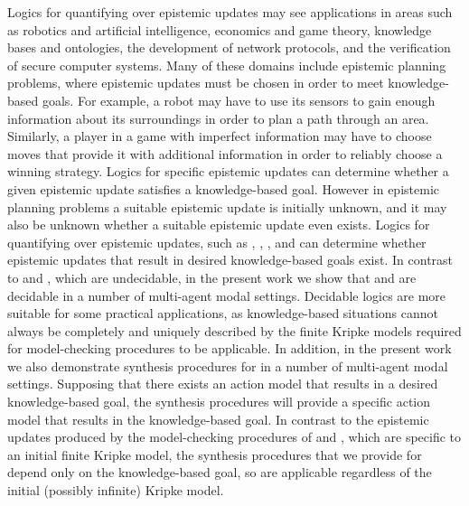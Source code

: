 Logics for quantifying over epistemic updates may see applications in areas such as robotics and artificial intelligence, economics and game theory, knowledge bases and ontologies, the development of network protocols, and the verification of secure computer systems.
Many of these domains include epistemic planning problems, where epistemic updates must be chosen in order to meet knowledge-based goals.
For example, a robot may have to use its sensors to gain enough information about its surroundings in order to plan a path through an area.
Similarly, a player in a game with imperfect information may have to choose moves that provide it with additional information in order to reliably choose a winning strategy.
Logics for specific epistemic updates can determine whether a given epistemic update satisfies a knowledge-based goal.
However in epistemic planning problems a suitable epistemic update is initially unknown, and it may also be unknown whether a suitable epistemic update even exists.
Logics for quantifying over epistemic updates, such as \logicApal{}, \logicGal{}, \logicRml{}, and \logicAaml{} can determine whether epistemic updates that result in desired knowledge-based goals exist.
In contrast to \logicApal{} and \logicGal{}, which are undecidable, in the present work we show that \logicRml{} and \logicAaml{} are decidable in a number of multi-agent modal settings.
Decidable logics are more suitable for some practical applications, as knowledge-based situations cannot always be completely and uniquely described by the finite Kripke models required for model-checking procedures to be applicable.
In addition, in the present work we also demonstrate synthesis procedures for \logicAaml{} in a number of multi-agent modal settings.
Supposing that there exists an action model that results in a desired knowledge-based goal, the synthesis procedures will provide a specific action model that results in the knowledge-based goal.
In contrast to the epistemic updates produced by the model-checking procedures of \logicApal{} and \logicGal{}, which are specific to an initial finite Kripke model, the synthesis procedures that we provide for \logicAaml{} depend only on the knowledge-based goal, so are applicable regardless of the initial (possibly infinite) Kripke model.

